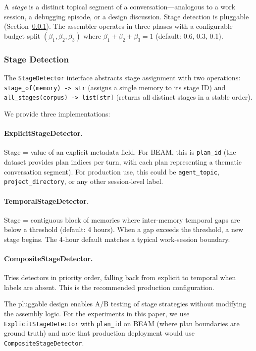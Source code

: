 \documentclass[11pt]{article}
\begin{document}
A \emph{stage} is a distinct topical segment of a conversation---analogous to a work session, a debugging episode, or a design
discussion.  Stage detection is pluggable (Section~\ref{sec:stage-detection}).
The assembler operates in three phases with a configurable budget
split $(\beta_1, \beta_2, \beta_3)$ where
$\beta_1 + \beta_2 + \beta_3 = 1$ (default: 0.6, 0.3, 0.1).

\subsubsection{Stage Detection}
\label{sec:stage-detection}

The \texttt{StageDetector} interface abstracts stage assignment with
two operations: \texttt{stage\_of(memory) -> str} (assigns a single
memory to its stage ID) and \texttt{all\_stages(corpus) -> list[str]}
(returns all distinct stages in a stable order).

We provide three implementations:

\paragraph{ExplicitStageDetector.}
Stage = value of an explicit metadata field.  For BEAM, this is
\texttt{plan\_id} (the dataset provides plan indices per turn, with
each plan representing a thematic conversation segment).  For
production use, this could be \texttt{agent\_topic},
\texttt{project\_directory}, or any other session-level label.

\paragraph{TemporalStageDetector.}
Stage = contiguous block of memories where inter-memory temporal gaps
are below a threshold (default: 4 hours).  When a gap exceeds the
threshold, a new stage begins.  The 4-hour default matches a typical
work-session boundary.

\paragraph{CompositeStageDetector.}
Tries detectors in priority order, falling back from explicit to
temporal when labels are absent.  This is the recommended production
configuration.

The pluggable design enables A/B testing of stage strategies without
modifying the assembly logic.  For the experiments in this paper, we
use \texttt{ExplicitStageDetector} with \texttt{plan\_id} on BEAM
(where plan boundaries are ground truth) and note that production
deployment would use \texttt{CompositeStageDetector}.
\end{document}
